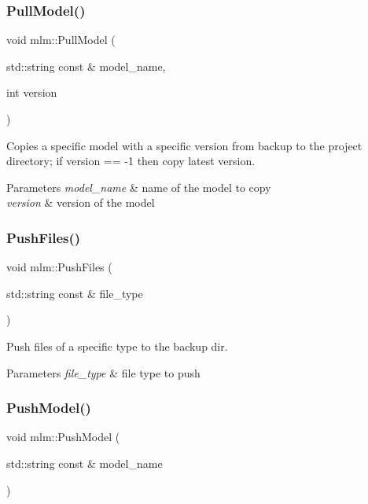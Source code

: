 \subsubsection{\texorpdfstring{Pull\+Model()}{PullModel()}}
{\footnotesize\ttfamily void mlm\+::\+Pull\+Model (\begin{DoxyParamCaption}\item[{std\+::string const \&}]{model\+\_\+name,  }\item[{int}]{version }\end{DoxyParamCaption})}



Copies a specific model with a specific version from backup to the project directory; if version == -\/1 then copy latest version. 


\begin{DoxyParams}{Parameters}
{\em model\+\_\+name} & name of the model to copy \\
\hline
{\em version} & version of the model \\
\hline
\end{DoxyParams}
\mbox{\label{namespacemlm_a68835e331da902afbc67f55a3036ce2d}} 
\subsubsection{\texorpdfstring{Push\+Files()}{PushFiles()}}
{\footnotesize\ttfamily void mlm\+::\+Push\+Files (\begin{DoxyParamCaption}\item[{std\+::string const \&}]{file\+\_\+type }\end{DoxyParamCaption})}



Push files of a specific type to the backup dir. 


\begin{DoxyParams}{Parameters}
{\em file\+\_\+type} & file type to push \\
\hline
\end{DoxyParams}
\mbox{\label{namespacemlm_ae55c31193af71d6e46896ba16e806e45}} 
\subsubsection{\texorpdfstring{Push\+Model()}{PushModel()}}
{\footnotesize\ttfamily void mlm\+::\+Push\+Model (\begin{DoxyParamCaption}\item[{std\+::string const \&}]{model\+\_\+name }\end{DoxyParamCaption})}



